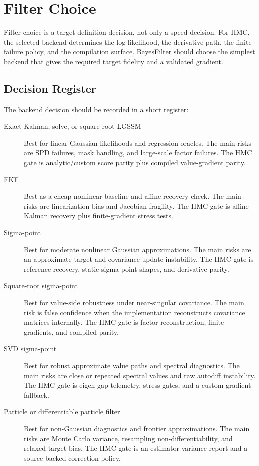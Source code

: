 \chapter{Filter Choice}
\label{ch:bf-filter-choice}

Filter choice is a target-definition decision, not only a speed decision.  For
HMC, the selected backend determines the log likelihood, the derivative path,
the finite-failure policy, and the compilation surface.  BayesFilter should
choose the simplest backend that gives the required target fidelity and a
validated gradient.

\section{Decision Register}
\label{sec:bf-filter-choice-register}

The backend decision should be recorded in a short register:
\begin{description}
  \item[Exact Kalman, solve, or square-root LGSSM]
  Best for linear Gaussian likelihoods and regression oracles.  The main risks
  are SPD failures, mask handling, and large-scale factor failures.  The HMC
  gate is analytic/custom score parity plus compiled value-gradient parity.

  \item[EKF]
  Best as a cheap nonlinear baseline and affine recovery check.  The main risks
  are linearization bias and Jacobian fragility.  The HMC gate is affine Kalman
  recovery plus finite-gradient stress tests.

  \item[Sigma-point]
  Best for moderate nonlinear Gaussian approximations.  The main risks are an
  approximate target and covariance-update instability.  The HMC gate is
  reference recovery, static sigma-point shapes, and derivative parity.

  \item[Square-root sigma-point]
  Best for value-side robustness under near-singular covariance.  The main risk
  is false confidence when the implementation reconstructs covariance matrices
  internally.  The HMC gate is factor reconstruction, finite gradients, and
  compiled parity.

  \item[SVD sigma-point]
  Best for robust approximate value paths and spectral diagnostics.  The main
  risks are close or repeated spectral values and raw autodiff instability.  The
  HMC gate is eigen-gap telemetry, stress gates, and a custom-gradient fallback.

  \item[Particle or differentiable particle filter]
  Best for non-Gaussian diagnostics and frontier approximations.  The main
  risks are Monte Carlo variance, resampling non-differentiability, and relaxed
  target bias.  The HMC gate is an estimator-variance report and a source-backed
  correction policy.
\end{description}

